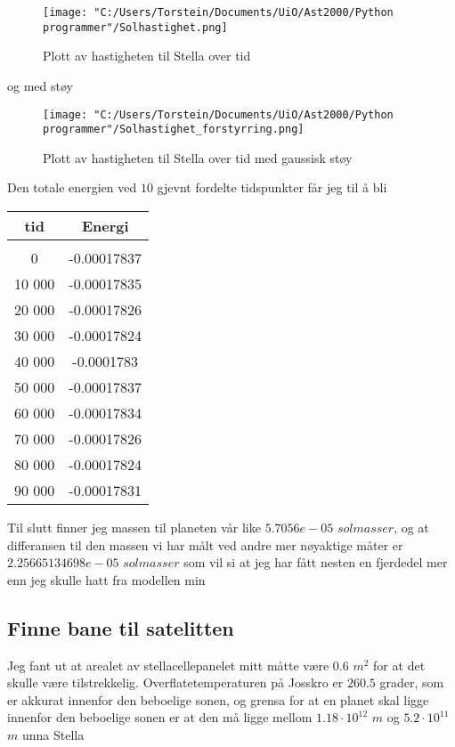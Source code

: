 \documentclass[11pt, A4paper, norsk]{report}
\begin{document}
\begin{figure}[H]
\texttt{[image: "C:/Users/Torstein/Documents/UiO/Ast2000/Python programmer"/Solhastighet.png]}
\caption{Plott av hastigheten til Stella over tid}
\end{figure}

og med støy

\begin{figure}[H]
\texttt{[image: "C:/Users/Torstein/Documents/UiO/Ast2000/Python programmer"/Solhastighet\_forstyrring.png]}
\caption{Plott av hastigheten til Stella over tid med gaussisk støy}
\end{figure}

Den totale energien ved $10$ gjevnt fordelte tidspunkter får jeg til å bli
\begin{center}
	\begin{tabular}{| c|c |}
\hline
tid & Energi \\
\hline &  \\
0 & -0.00017837 \\
10 000 & -0.00017835 \\
20 000 & -0.00017826 \\
30 000 & -0.00017824 \\
40 000 & -0.0001783  \\
50 000 & -0.00017837 \\
60 000 & -0.00017834 \\
70 000 & -0.00017826 \\
80 000 & -0.00017824 \\
90 000 & -0.00017831 \\
\hline
	\end{tabular}
\end{center}

Til slutt finner jeg massen til planeten vår like $5.7056e-05$ $solmasser$, og at differansen til den massen vi har målt ved andre mer nøyaktige måter er $2.25665134698e-05$ $solmasser$ som vil si at jeg har fått nesten en fjerdedel mer enn jeg skulle hatt fra modellen min

		\subsection{Finne bane til satelitten}
Jeg fant ut at arealet av stellacellepanelet mitt måtte være $0.6$ $m^2$ for at det skulle være tilstrekkelig. Overflatetemperaturen på Josskro er $260.5$ grader, som er akkurat innenfor den beboelige sonen, og grensa for at en planet skal ligge innenfor den beboelige sonen er at den må ligge mellom $1.18 \cdot 10^12$ $m$ og $5.2 \cdot 10^11$ $m$ unna Stella
\end{document}
